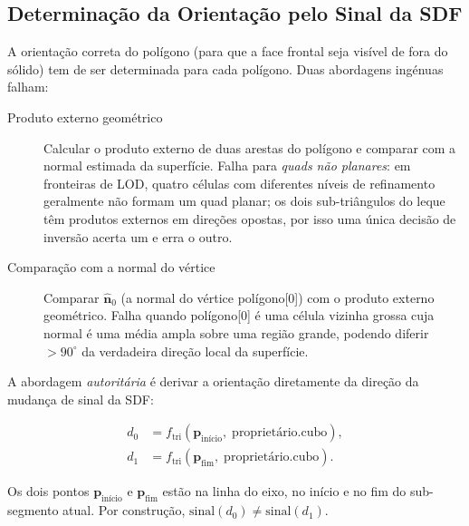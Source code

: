 \documentclass[10pt,a4paper]{article}
\begin{document}
\subsection{Determinação da Orientação pelo Sinal da SDF}
\label{sec:itriangles:winding}

A orientação correta do polígono (para que a face frontal seja
visível de fora do sólido) tem de ser determinada para cada polígono.
Duas abordagens ingénuas falham:
\begin{description}
  \item[Produto externo geométrico] Calcular o produto externo de
    duas arestas do polígono e comparar com a normal estimada da
    superfície. Falha para \emph{quads não planares}: em fronteiras
    de LOD, quatro células com diferentes níveis de refinamento
    geralmente não formam um quad planar; os dois sub-triângulos do
    leque têm produtos externos em direções opostas, por isso uma
    única decisão de inversão acerta um e erra o outro.
  \item[Comparação com a normal do vértice] Comparar
    $\hat{\mathbf{n}}_0$ (a normal do vértice polígono[0]) com o
    produto externo geométrico. Falha quando polígono[0] é uma célula
    vizinha grossa cuja normal é uma média ampla sobre uma região
    grande, podendo diferir $>90^\circ$ da verdadeira direção local
    da superfície.
\end{description}

A abordagem \emph{autoritária} é derivar a orientação diretamente da
direção da mudança de sinal da SDF:

\begin{align*}
  d_0 &= f_{\text{tri}}(\mathbf{p}_{\text{início}},\;
          \text{proprietário.cubo}), \\
  d_1 &= f_{\text{tri}}(\mathbf{p}_{\text{fim}},\;
          \text{proprietário.cubo}).
\end{align*}

Os dois pontos $\mathbf{p}_{\text{início}}$ e $\mathbf{p}_{\text{fim}}$
estão na linha do eixo, no início e no fim do sub-segmento atual.
Por construção, $\text{sinal}(d_0) \neq \text{sinal}(d_1)$.
\end{document}
